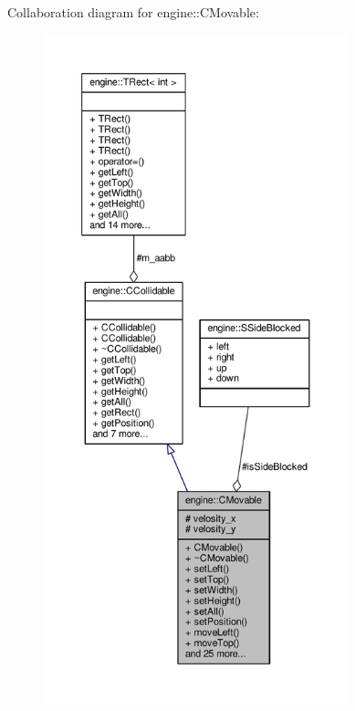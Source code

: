 Collaboration diagram for engine\-:\-:C\-Movable\-:\nopagebreak
\begin{figure}[H]
\begin{center}
\leavevmode
\includegraphics[height=550pt]{classengine_1_1CMovable__coll__graph}
\end{center}
\end{figure}
